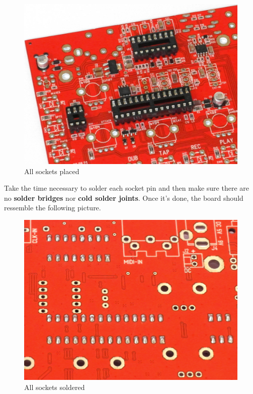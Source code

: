 \documentclass{scrartcl}
\begin{document}
\begin{figure}[!ht]
    \begin{center}
        \includegraphics[scale=0.28]{assets/pcb-sockets.jpg}
        \caption{All sockets placed}
    \end{center}
\end{figure}
Take the time necessary to solder each socket pin and then make sure there are no \textbf{solder bridges} nor \textbf{cold solder joints}. Once it's done, the board should ressemble the following picture.

\begin{figure}[!ht]
    \begin{center}
        \includegraphics[scale=0.22]{assets/ic-solder.jpg}
        \caption{All sockets soldered}
    \end{center}
\end{figure}
\end{document}
